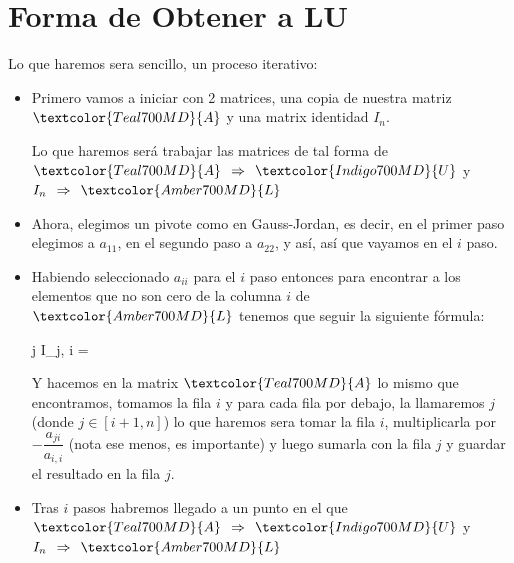 \documentclass[12pt, fleqn]{report}                             %
\def \Eq {equation}                                             %
\newenvironment{MultiLineEquation*}[1]                          %
        {\begin{\Eq*}\begin{alignedat}{#1}}                         %
        {\end{alignedat}\end{\Eq*}}                                 %
\DeclareMathOperator \Space     {\quad}                         %
\DeclareMathOperator \MiniSpace {\;}                            %
\theoremstyle{break}                                            %
\newcommand \lInfire {\MiniSpace \Rightarrow \MiniSpace}        %
\newcommand{\Color}[2]{\textcolor{#1}{#2}}                      %
\newcommand \ColorMatrixA       {Teal700MD}                     %
\newcommand \ColorMatrixL       {Amber700MD}                    %
\newcommand \ColorMatrixU       {Indigo700MD}                   %
\newcommand \MatrixA      {\Color{\ColorMatrixA}{A}}            %
\newcommand \MatrixL      {\Color{\ColorMatrixL}{L}}            %
\newcommand \MatrixU      {\Color{\ColorMatrixU}{U}}            %
\begin{document}
        \clearpage
        \section{Forma de Obtener a LU}

            Lo que haremos sera sencillo, un proceso iterativo:
            \begin{itemize}
                \item Primero vamos a iniciar con 2 matrices, una copia de nuestra matriz $\MatrixA$
                    y una matrix identidad $I_n$.

                    Lo que haremos será trabajar las matrices de tal forma de $\MatrixA \lInfire \MatrixU$
                    y $I_n \lInfire \MatrixL$
                \item 
                    Ahora, elegimos un pivote como en Gauss-Jordan, es decir, en el primer
                    paso elegimos a $a_{1 1}$, en el segundo paso a $a_{2 2}$, y así, así que vayamos en 
                    el $i$ paso.
                \item
                    Habiendo seleccionado $a_{i i}$ para el $i$ paso entonces para encontrar
                    a los elementos que no son cero de la columna $i$ de $\MatrixL$ tenemos que 
                    seguir la siguiente fórmula:
                    \begin{MultiLineEquation*}{3}
                        \forall j \in [i+1, n] \Space I_{j, i} = 
                    \end{MultiLineEquation*}

                    Y hacemos en la matrix $\MatrixA$ lo mismo que encontramos, tomamos la fila
                    $i$ y para cada fila por debajo, la llamaremos $j$ (donde $j \in [i+1, n]$) lo
                    que haremos sera tomar la fila $i$, multiplicarla por $- \dfrac{a_{j i}}{a_{i, i}}$
                    (nota ese menos, es importante)
                    y luego sumarla con la fila $j$ y guardar el resultado en la fila $j$.
                \item
                    Tras $i$ pasos habremos llegado a un punto en el que $\MatrixA \lInfire \MatrixU$
                    y $I_n \lInfire \MatrixL$
            \end{itemize}
\end{document}
